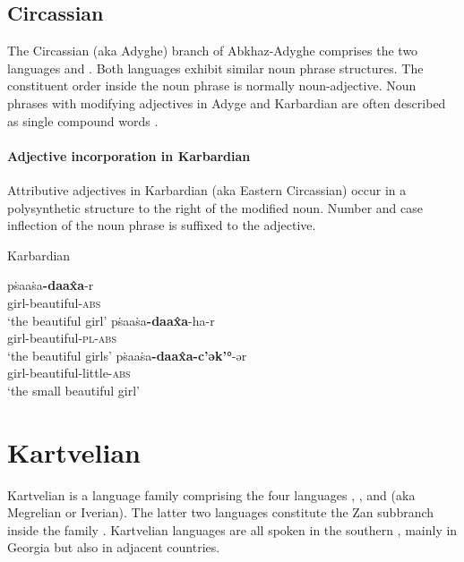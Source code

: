 \subsection{Circassian}
The Circassian (aka Adyghe) branch of Abkhaz-Adyghe comprises the two languages  and . Both languages exhibit similar noun phrase structures. The constituent order inside the noun phrase is normally noun-adjective. Noun phrases with modifying adjectives in Adyge and Karbardian are often described as single compound words \citep[222]{comrie1981}.

\paragraph*{Adjective incorporation in Karbardian}
Attributive adjectives in Karbardian (aka Eastern Circassian) occur in a polysynthetic structure to the right of the modified noun. Number and case inflection of the noun phrase is suffixed to the adjective.
\begin{exe}
\ex \rm{Karbardian \citep[295]{colarusso1989}}
\begin{xlist}
\ex	
\gll	pṡaaṡa\textbf{-daax̂a}-r\\
	girl-beautiful-\textsc{abs}\\
\glt	‘the beautiful girl’
\ex
\gll	pṡaaṡa\textbf{-daax̂a}-ha-r\\
	girl-beautiful-\textsc{pl}-\textsc{abs}\\
\glt	‘the beautiful girls’
\ex
\gll	pṡaaṡa\textbf{-daax̂a-c'ək'°}-ər\\
	girl-beautiful-little-\textsc{abs}\\
\glt	‘the small beautiful girl’
\end{xlist}
\end{exe}

\section{Kartvelian}\label{kartvelian synchr}
Kartvelian is a language family comprising the four languages , ,  and  (aka Megrelian or Iverian). The latter two languages constitute the Zan subbranch inside the family \cite[220]{salminen2007}. Kartvelian languages are all spoken in the southern , mainly in Georgia but also in adjacent countries.

